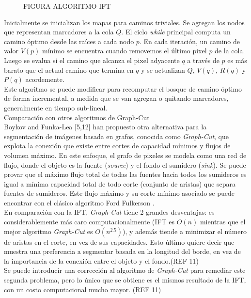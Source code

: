 \documentclass[a4paper,10pt]{article}
\begin{document}
 \begin{figure}[H]
        \caption{FIGURA ALGORITMO IFT}
        \label{fig:IFTrace-IFT-algorithm}
\end{figure}

Inicialmente se inicializan los mapas para caminos triviales. Se agregan 
los nodos que representan marcadores a la cola $Q$. El ciclo \textit{while}
principal computa un camino óptimo desde las raíces a cada nodo $p$. En 
cada iteración, un camino de valor $V(p)$ mínimo se encuentra cuando
removemos el último pixel $p$ de la cola. Luego se evalua si el camino que
alcanza el pixel adyacente $q$ a través de $p$ es más barato que el actual 
camino que termina en $q$ y se actualizan $Q$, $V(q)$, $R(q)$ y $P(q)$ 
acordemente.\\
Este algoritmo se puede modificar para recomputar el bosque de camino óptimo 
de forma incremental, a medida que se van agregan o quitando marcadores, 
generalmente en tiempo sub-lineal.\\

Comparación con otros algoritmos de Graph-Cut\\

Boykov and Funka-Lea [5,12] han propuesto otra alternativa para la segmentación
de imágenes basada en grafos, conocida como \textit{Graph-Cut}, que explota 
la conexión que existe entre cortes de capacidad mínimos y flujos de volumen
máximo. En este enfoque, el grafo de pixeles se modela como una red de flujo,
donde el objeto es la fuente (\textit{source}) y el fondo el sumidero
(\textit{sink}). Se puede provar que el máximo flujo total de todas las fuentes
hacia todos los sumideros es igual a mínima capacidad total de todo corte 
(conjunto de aristas) que separa fuentes de sumideros. Este flujo máximo y su 
corte mínimo asociado se puede encontrar con el clásico algoritmo 
Ford Fulkerson \cite{Cormen:2009:IAT:1614191}.\\
En comparación con la IFT, \textit{Graph-Cut} tiene 2 grandes desventajas: es 
considerablemente más caro computacionalmente (IFT es $O(n)$ mientras que
el mejor algoritmo \textit{Graph-Cut} es $O(n^{2.5})$), y además tiende a 
minimizar el número de aristas en el corte, en vez de sus capacidades. Esto 
último quiere decir que muestra una preferencia a segmentar basada en la 
longitud del borde, en vez de la importancia de la conexión entre el objeto y 
el fondo.(REF 11)\\
Se puede introducir una corrección al algoritmo de \textit{Graph-Cut} para 
remediar este segunda problema, pero lo único que se obtiene es el mismos 
resultado de la IFT, con un costo computacional mucho mayor. (REF 11)
\end{document}
